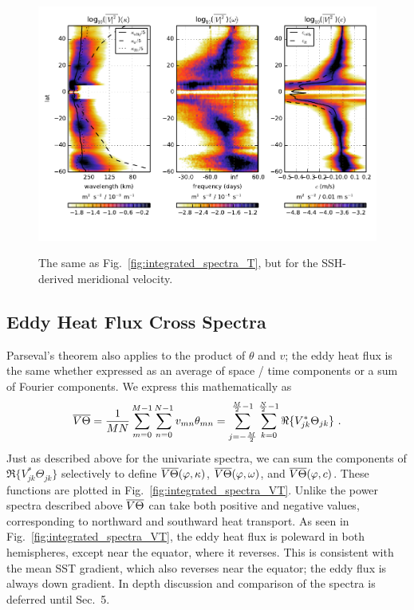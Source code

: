 \documentclass[10pt]{article}
\newcommand{\ol}{\ensuremath{\overline}}
\begin{document}
\begin{figure}[t]
  \noindent\includegraphics{../figures/SAT_50degwide/integrated_spectra_V.pdf}\\
  \caption{The same as Fig.~\ref{fig:integrated_spectra_T}, but for the SSH-derived meridional velocity.}
  \label{fig:integrated_spectra_V}
\end{figure}

\subsection{Eddy Heat Flux Cross Spectra}

Parseval's theorem also applies to the product of $\theta$ and $v$; the eddy heat flux is the same whether expressed as an average of space / time components or a sum of Fourier components. We express this mathematically as
\begin{equation}
\ol{V\Theta} = \frac{1}{MN} \sum_{m=0}^{M-1} \sum_{n=0}^{N-1} v_{mn} \theta_{mn} = \sum_{j=-\frac{M}{2}}^{\frac{M}{2}-1} \sum_{k=0}^{\frac{N}{2}-1} \Re \{ V_{jk}^\ast  \Theta_{jk} \} \ .
\end{equation}
Just as described above for the univariate spectra, we can sum the components of $\Re \{ V_{jk}^\ast  \Theta_{jk} \}$ selectively to define $\ol{V\Theta}(\varphi, \kappa)$, $\ol{V\Theta}(\varphi, \omega)$, and $\ol{V\Theta}(\varphi, c)$. These functions are plotted in  Fig.~\ref{fig:integrated_spectra_VT}. Unlike the power spectra described above $\ol{V\Theta}$ can take both positive and negative values, corresponding to northward and southward heat transport. As seen in Fig.~\ref{fig:integrated_spectra_VT}, the eddy heat flux is poleward in both hemispheres, except near the equator, where it reverses. This is consistent with the mean SST gradient, which also reverses near the equator; the eddy flux is always down gradient. In depth discussion and comparison of the spectra is deferred until Sec.~5.  %
\end{document}
